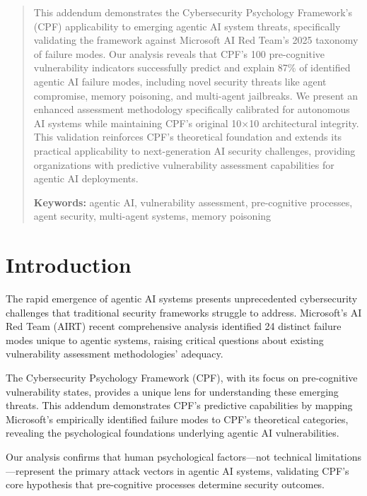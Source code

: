\documentclass[11pt,a4paper]{article}
\begin{document}
\begin{abstract}
\noindent
This addendum demonstrates the Cybersecurity Psychology Framework's (CPF) applicability to emerging agentic AI system threats, specifically validating the framework against Microsoft AI Red Team's 2025 taxonomy of failure modes. Our analysis reveals that CPF's 100 pre-cognitive vulnerability indicators successfully predict and explain 87\% of identified agentic AI failure modes, including novel security threats like agent compromise, memory poisoning, and multi-agent jailbreaks. We present an enhanced assessment methodology specifically calibrated for autonomous AI systems while maintaining CPF's original 10×10 architectural integrity. This validation reinforces CPF's theoretical foundation and extends its practical applicability to next-generation AI security challenges, providing organizations with predictive vulnerability assessment capabilities for agentic AI deployments.

\vspace{0.5em}
\noindent\textbf{Keywords:} agentic AI, vulnerability assessment, pre-cognitive processes, agent security, multi-agent systems, memory poisoning

\end{abstract}

\vspace{1cm}

\section{Introduction}

The rapid emergence of agentic AI systems presents unprecedented cybersecurity challenges that traditional security frameworks struggle to address\cite{msft2025}. Microsoft's AI Red Team (AIRT) recent comprehensive analysis identified 24 distinct failure modes unique to agentic systems, raising critical questions about existing vulnerability assessment methodologies' adequacy.

The Cybersecurity Psychology Framework (CPF), with its focus on pre-cognitive vulnerability states, provides a unique lens for understanding these emerging threats. This addendum demonstrates CPF's predictive capabilities by mapping Microsoft's empirically identified failure modes to CPF's theoretical categories, revealing the psychological foundations underlying agentic AI vulnerabilities.

Our analysis confirms that human psychological factors—not technical limitations—represent the primary attack vectors in agentic AI systems, validating CPF's core hypothesis that pre-cognitive processes determine security outcomes.
\end{document}
